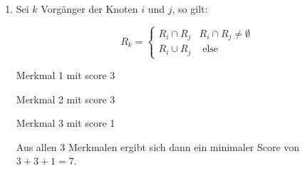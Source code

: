 \documentclass{homework}
\date{Montag, dem 29. Oktober 2012}
\author{Stefan Meißner (4279113) und Niels Hoppe (4356370)}
\begin{document}
\maketitle
\begin{enumerate} 


\begin{enumerate}

\item

Sei $k$ Vorgänger der Knoten $i$ und $j$, so gilt:

$$R_k=\begin{cases}
R_i \cap R_j & R_i \cap R_j \neq \emptyset\\
R_i \cup R_j & \text{ else}
\end{cases}$$

Merkmal 1 mit score 3


Merkmal 2 mit score 3


Merkmal 3 mit score 1


Aus allen 3 Merkmalen ergibt sich dann ein minimaler Score von $3+3+1=7$.


\end{enumerate}
\end{enumerate}
\end{document}
